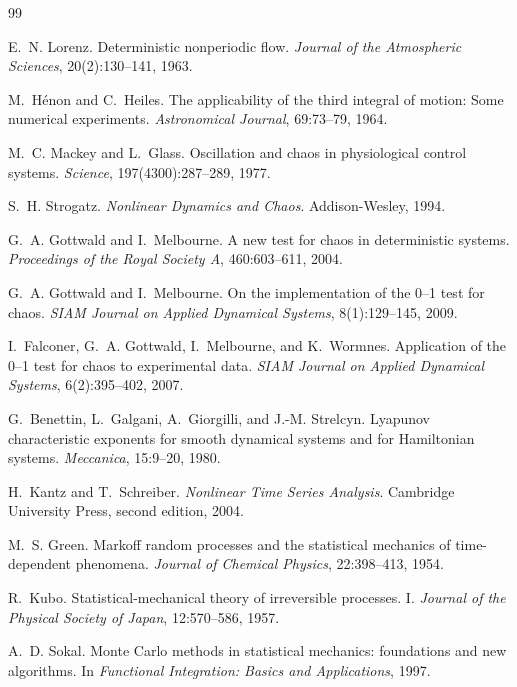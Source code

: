 \documentclass[aip,cha,preprint,amsmath,amssymb,floatfix]{revtex4-2}
\begin{document}
\begin{thebibliography}{99}

E.~N. Lorenz.
\newblock Deterministic nonperiodic flow.
\newblock \emph{Journal of the Atmospheric Sciences}, 20(2):130--141, 1963.

M.~H\'{e}non and C.~Heiles.
\newblock The applicability of the third integral of motion: Some numerical experiments.
\newblock \emph{Astronomical Journal}, 69:73--79, 1964.

M.~C. Mackey and L.~Glass.
\newblock Oscillation and chaos in physiological control systems.
\newblock \emph{Science}, 197(4300):287--289, 1977.

S.~H. Strogatz.
\newblock \emph{Nonlinear Dynamics and Chaos}.
\newblock Addison-Wesley, 1994.

G.~A. Gottwald and I.~Melbourne.
\newblock A new test for chaos in deterministic systems.
\newblock \emph{Proceedings of the Royal Society A}, 460:603--611, 2004.

G.~A. Gottwald and I.~Melbourne.
\newblock On the implementation of the 0--1 test for chaos.
\newblock \emph{SIAM Journal on Applied Dynamical Systems}, 8(1):129--145, 2009.

I.~Falconer, G.~A. Gottwald, I.~Melbourne, and K.~Wormnes.
\newblock Application of the 0--1 test for chaos to experimental data.
\newblock \emph{SIAM Journal on Applied Dynamical Systems}, 6(2):395--402, 2007.

G.~Benettin, L.~Galgani, A.~Giorgilli, and J.-M. Strelcyn.
\newblock Lyapunov characteristic exponents for smooth dynamical systems and for Hamiltonian systems.
\newblock \emph{Meccanica}, 15:9--20, 1980.

H.~Kantz and T.~Schreiber.
\newblock \emph{Nonlinear Time Series Analysis}.
\newblock Cambridge University Press, second edition, 2004.

M.~S. Green.
\newblock Markoff random processes and the statistical mechanics of time-dependent phenomena.
\newblock \emph{Journal of Chemical Physics}, 22:398--413, 1954.

R.~Kubo.
\newblock Statistical-mechanical theory of irreversible processes. I.
\newblock \emph{Journal of the Physical Society of Japan}, 12:570--586, 1957.

A.~D. Sokal.
\newblock Monte Carlo methods in statistical mechanics: foundations and new algorithms.
\newblock In \emph{Functional Integration: Basics and Applications}, 1997.

\end{thebibliography}
\end{document}
